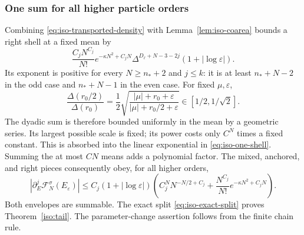 \documentclass[11pt]{article}
\numberwithin{equation}{section}
\theoremstyle{definition}
\newcommand{\eps}{\varepsilon}
\begin{document}
\subsubsection{One sum for all higher particle orders}

Combining \eqref{eq:iso-transported-density} with
Lemma~\ref{lem:iso-coarea} bounds a right shell at a fixed mean by
\begin{equation}\label{eq:iso-one-shell}
 \frac{C_jN^{C_j}}{N!}e^{-\kappa N^2+C_jN}
 \Delta^{D_\ell+N-3-2j}(1+|\log\eps|).
\end{equation}
Its exponent is positive for every $N\ge n_*+2$ and $j\le k$:
it is at least $n_*+N-2$ in the odd case and $n_*+N-1$ in the
even case.  For fixed $\mu,\eps$,
\[
 \frac{\Delta(r_0/2)}{\Delta(r_0)}
 =\frac12\sqrt{\frac{|\mu|+r_0+\eps}{|\mu|+r_0/2+\eps}}
       \in[1/2,1/\sqrt2].
\]
The dyadic sum is therefore bounded uniformly in the mean by a geometric series.
Its largest possible scale is fixed; its power costs only $C^N$
times a fixed constant.  This is absorbed into the linear exponential
in \eqref{eq:iso-one-shell}.  Summing the at most $CN$ means adds
a polynomial factor. The mixed, anchored, and
right pieces consequently obey, for all higher orders,
\begin{equation}\label{eq:iso-every-order-tail}
 |\partial_{{E}}^j\mathcal F_N^\sigma({E}_\eps)|
 \le C_j(1+|\log\eps|)
 \left(C_j^NN^{-N/2+C_j}
       +\frac{N^{C_j}}{N!}e^{-\kappa N^2+C_jN}\right).
\end{equation}
Both envelopes are summable.  The exact split
\eqref{eq:iso-exact-split} proves Theorem~\ref{iso:tail}.
The parameter-change assertion follows from the finite chain rule.
\end{document}
